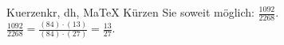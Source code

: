 \begin{MAufgabe}{Kuerzen}{kr, dh, MaTeX}
K\"urzen Sie soweit m\"oglich: $\frac{1092}{2268}$.\\ 
\ifLsg\MLoesung
\quad $\frac{1092}{2268}=\frac{(84)\cdot(13)}{(84)\cdot(27)}=\frac{13}{27}$.\else\relax\fi
 \end{MAufgabe}